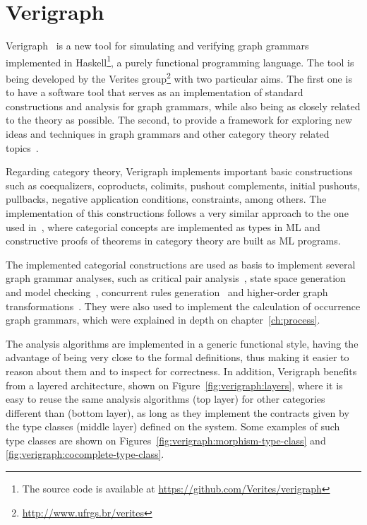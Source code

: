 \chapter{Verigraph}\label{ch:verigraph}

Verigraph~\cite{verigraph} is a new tool for simulating and verifying graph grammars implemented in Haskell\footnote{The source code is available at \url{https://github.com/Verites/verigraph}}, a purely functional programming language. The tool is being developed by the Verites group\footnote{\url{http://www.ufrgs.br/verites}} with two particular aims. The first one is to have a software tool that serves as an implementation of standard constructions and analysis for graph grammars, while also being as closely related to the theory as possible. The second, to provide a framework for exploring new ideas and techniques in graph grammars and other category theory related topics~\cite{BezerraETMF2016,Costa2016,CostaETMF2016, Becker2014}.

Regarding category theory, Verigraph implements important basic constructions such as coequalizers, coproducts, colimits, pushout complements, initial pushouts, pullbacks, negative application conditions, constraints, among others. The implementation of this constructions follows a very similar approach to the one used in~\cite{Rydeheard1988}, where categorial concepts are implemented as types in ML and constructive proofs of theorems in category theory are built as ML programs.

The implemented categorial constructions are used as basis to implement several graph grammar analyses, such as critical pair analysis~\cite{Lambers2006}, state space generation and model checking~\cite{Becker2014}, concurrent rules generation~\cite{BezerraETMF2016} and higher-order graph transformations~\cite{Machado2015}. They were also used to implement the calculation of occurrence graph grammars, which were explained in depth on chapter~\ref{ch:process}.

The analysis algorithms are implemented in a generic functional style, having the advantage of being very close to the formal definitions, thus making it easier to reason about them and to inspect for correctness. In addition, Verigraph benefits from a layered architecture, shown on Figure~\ref{fig:verigraph:layers}, where it is easy to reuse the same analysis algorithms (top layer) for other categories different than  (bottom layer), as long as they implement the contracts given by the type classes (middle layer) defined on the system. Some examples of such type classes are shown on Figures~\ref{fig:verigraph:morphism-type-class} and \ref{fig:verigraph:cocomplete-type-class}.

